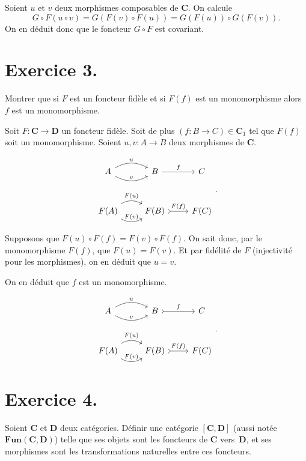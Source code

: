 \documentclass{../../td}
\begin{document}
  Soient $u$ et $v$ deux morphismes composables de $\mathbf{C}$.
  On calcule 
  \[
  G \circ F(u \circ v) = G(F(v)\circ F(u)) = G(F(u)) \circ G(F(v))
  .\]
  On en déduit donc que le foncteur $G \circ F$ est covariant.

  \chapter{Exercice 3.}
  \begin{slshape}
    \color{deepblue}
    Montrer que si $F$ est un foncteur fidèle et si $F(f)$ est un monomorphisme alors $f$ est un monomorphisme.
  \end{slshape}

  Soit $F : \mathbf{C} \to \mathbf{D}$ un foncteur fidèle.
  Soit de plus $(f : B \to C) \in \mathbf{C}_1$ tel que $F(f)$ soit un monomorphisme.
  Soient $u,v : A \to B$ deux morphismes de $\mathbf{C}$.

  \[
   \begin{tikzcd}
     A \arrow[bend left]{r}{u} \arrow[bend right]{r}{v} & B \arrow{r}{f} & C\\[5mm]
     F(A) \arrow[bend left]{r}{F(u)} \arrow[bend right]{r}{F(v)} & F(B) \arrow[tail]{r}{F(f)} & F(C)
   \end{tikzcd}
  .\]

  Supposons que $F(u) \circ F(f) = F(v) \circ F(f)$.
  On sait donc, par le monomorphisme $F(f)$, que $F(u) = F(v)$.
  Et par fidélité de $F$ (injectivité pour les morphismes), on en déduit que $u = v$.

  On en déduit que $f$ est un monomorphisme.

  \[
   \begin{tikzcd}
     A \arrow[bend left]{r}{u} \arrow[bend right]{r}{v} & B \arrow[tail]{r}{f} & C\\[5mm]
     F(A) \arrow[bend left]{r}{F(u)} \arrow[bend right]{r}{F(v)} & F(B) \arrow[tail]{r}{F(f)} & F(C)
   \end{tikzcd}
  .\]

  \chapter{Exercice 4.}

  \begin{slshape}
    \color{deepblue}
    Soient $\mathbf{C}$ et $\mathbf{D}$ deux catégories.
    Définir une catégorie $[\mathbf{C},\mathbf{D}]$ (aussi notée $\mathbf{Fun}(\mathbf{C},\mathbf{D})$) telle que ses objets sont les foncteurs de $\mathbf{C}$ vers~$\mathbf{D}$, et ses morphismes sont les transformations naturelles entre ces foncteurs.
  \end{slshape}
\end{document}
